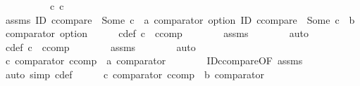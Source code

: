\begin{isabellebody}
%
\isadelimproof
%
\endisadelimproof
%
\isatagproof
{}\isamarkupfalse%
\ {\isacharminus}{\kern0pt}\isanewline
\ \ \isacommand{{\isacharbraceleft}{\kern0pt}}\isamarkupfalse%
\isanewline
\ \ \ \ \isamarkupfalse%
\ c\ c{\isacharprime}{\kern0pt}\isanewline
\ \ \ \ \isamarkupfalse%
\ assms{\isacharcolon}{\kern0pt}\ {\isachardoublequoteopen}ID\ ccompare\ {\isacharequal}{\kern0pt}\ {\isacharparenleft}{\kern0pt}Some\ c\ {\isacharcolon}{\kern0pt}{\isacharcolon}{\kern0pt}\ {\isacharprime}{\kern0pt}a\ comparator\ option{\isacharparenright}{\kern0pt}{\isachardoublequoteclose}\ {\isachardoublequoteopen}ID\ ccompare\ {\isacharequal}{\kern0pt}\ {\isacharparenleft}{\kern0pt}Some\ c{\isacharprime}{\kern0pt}\ {\isacharcolon}{\kern0pt}{\isacharcolon}{\kern0pt}\ {\isacharprime}{\kern0pt}b\ comparator\ option{\isacharparenright}{\kern0pt}{\isachardoublequoteclose}\isanewline
\ \ \ \ \isamarkupfalse%
\ c{\isacharunderscore}{\kern0pt}def{\isacharcolon}{\kern0pt}\ {\isachardoublequoteopen}c\ {\isacharequal}{\kern0pt}\ ccomp{\isachardoublequoteclose}\isanewline
\ \ \ \ \ \ \isamarkupfalse%
\ assms{\isacharparenleft}{\kern0pt}{}{\isacharparenright}{\kern0pt}\isanewline
\ \ \ \ \ \ \isamarkupfalse%
\ auto\isanewline
\ \ \ \ \isamarkupfalse%
\ c{\isacharprime}{\kern0pt}{\isacharunderscore}{\kern0pt}def{\isacharcolon}{\kern0pt}\ {\isachardoublequoteopen}c{\isacharprime}{\kern0pt}\ {\isacharequal}{\kern0pt}\ ccomp{\isachardoublequoteclose}\isanewline
\ \ \ \ \ \ \isamarkupfalse%
\ assms{\isacharparenleft}{\kern0pt}{}{\isacharparenright}{\kern0pt}\isanewline
\ \ \ \ \ \ \isamarkupfalse%
\ auto\isanewline
\ \ \ \ \isamarkupfalse%
\ c{\isacharcolon}{\kern0pt}\ {\isachardoublequoteopen}comparator\ {\isacharparenleft}{\kern0pt}ccomp\ {\isacharcolon}{\kern0pt}{\isacharcolon}{\kern0pt}\ {\isacharprime}{\kern0pt}a\ comparator{\isacharparenright}{\kern0pt}{\isachardoublequoteclose}\isanewline
\ \ \ \ \ \ \isamarkupfalse%
\ ID{\isacharunderscore}{\kern0pt}ccompare{\isacharprime}{\kern0pt}{\isacharbrackleft}{\kern0pt}OF\ assms{\isacharparenleft}{\kern0pt}{}{\isacharparenright}{\kern0pt}{\isacharbrackright}{\kern0pt}\isanewline
\ \ \ \ \ \ \isamarkupfalse%
\ {\isacharparenleft}{\kern0pt}auto\ simp{\isacharcolon}{\kern0pt}\ c{\isacharunderscore}{\kern0pt}def{\isacharparenright}{\kern0pt}\isanewline
\ \ \ \ \isamarkupfalse%
\ c{\isacharprime}{\kern0pt}{\isacharcolon}{\kern0pt}\ {\isachardoublequoteopen}comparator\ {\isacharparenleft}{\kern0pt}ccomp\ {\isacharcolon}{\kern0pt}{\isacharcolon}{\kern0pt}\ {\isacharprime}{\kern0pt}b\ comparator{\isacharparenright}{\kern0pt}{\isachardoublequoteclose}\isanewline

\end{isabellebody}
